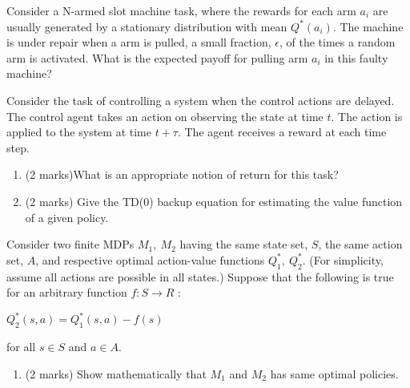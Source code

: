 \documentclass[addpoints,12pt,solution]{exam}
\begin{document}
\begin{questions}

 Consider a N-armed slot machine task, where the rewards for
each arm $a_i$ are usually generated by a stationary distribution with mean $Q^{*}(a_i)$. The machine is under repair when a arm is pulled, a small fraction, $\epsilon$, of the times a random arm is activated. What is the expected payoff for pulling arm $a_i$ in this faulty machine?

\begin{solution}


\end{solution}


 Consider the task of controlling a system when the control actions are delayed. The control agent takes an action on observing the state at time $t$. The action is applied to the system at time $t + \tau$. The agent
receives a reward at each time step.
\begin{enumerate}[label=(\alph*)]

\item (2 marks)What is an appropriate notion of return for this task?

\begin{solution}

\end{solution}

\item (2 marks) Give the TD(0) backup equation for estimating the value function of a given policy.

\begin{solution}


\end{solution}
\end{enumerate}
        
 Consider two finite MDPs $M_1,\ M_2$ having the same state set, $S$, the same action set, $A$, and respective optimal action-value functions $Q^*_1,\ Q^*_2$. (For simplicity, assume all actions are possible in all states.) Suppose that the following is true for an arbitrary function $f: S \rightarrow R$ :\\
\begin{center}
$Q^*_2(s, a) = Q^*_1(s, a) - f(s)$
\end{center}
for all $s \in S$ and $a \in A$.
\begin{enumerate}[label=(\alph*)]
\item (2 marks) Show mathematically that $M_1$ and $M_2$ has same optimal policies.
\begin{solution}


\end{solution}
\end{enumerate}
\end{questions}
\end{document}
